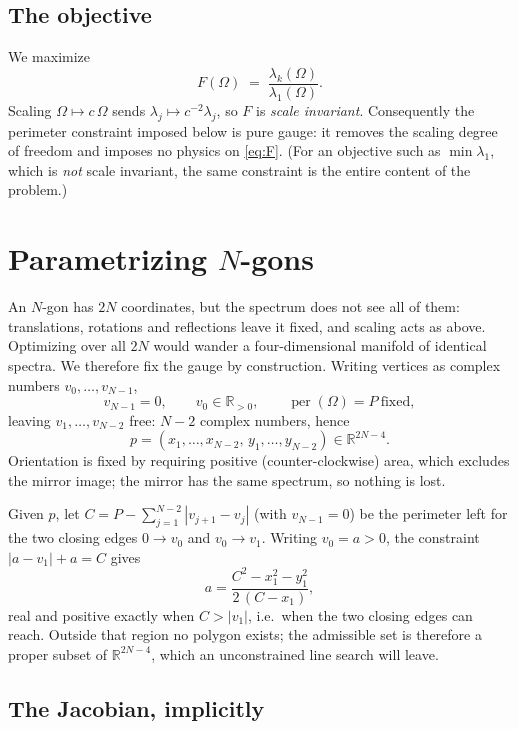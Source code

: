 \documentclass[11pt]{article}
\newcommand{\Om}{\Omega}
\theoremstyle{definition}
\begin{document}
\subsection{The objective}

We maximize
\begin{equation}\label{eq:F}
  F(\Om)\;=\;\frac{\lambda_k(\Om)}{\lambda_1(\Om)} .
\end{equation}
Scaling $\Om\mapsto c\,\Om$ sends $\lambda_j\mapsto c^{-2}\lambda_j$, so $F$ is
\emph{scale invariant}. Consequently the perimeter constraint imposed below is pure gauge: it
removes the scaling degree of freedom and imposes no physics on \eqref{eq:F}. (For an objective
such as $\min\lambda_1$, which is \emph{not} scale invariant, the same constraint is the entire
content of the problem.)

\section{Parametrizing $N$-gons}\label{sec:param}

An $N$-gon has $2N$ coordinates, but the spectrum does not see all of them: translations,
rotations and reflections leave it fixed, and scaling acts as above. Optimizing over all $2N$
would wander a four-dimensional manifold of identical spectra. We therefore fix the gauge by
construction. Writing vertices as complex numbers $v_0,\dots,v_{N-1}$,
\[
  v_{N-1}=0,\qquad v_0\in\mathbb{R}_{>0},\qquad \operatorname{per}(\Om)=P \ \text{fixed},
\]
leaving $v_1,\dots,v_{N-2}$ free: $N-2$ complex numbers, hence
\[
  p=(x_1,\dots,x_{N-2},\,y_1,\dots,y_{N-2})\in\mathbb{R}^{2N-4}.
\]
Orientation is fixed by requiring positive (counter-clockwise) area, which excludes the mirror
image; the mirror has the same spectrum, so nothing is lost.

Given $p$, let $C=P-\sum_{j=1}^{N-2}|v_{j+1}-v_j|$ (with $v_{N-1}=0$) be the perimeter left for
the two closing edges $0\to v_0$ and $v_0\to v_1$. Writing $v_0=a>0$, the constraint
$|a-v_1|+a=C$ gives
\begin{equation}\label{eq:a}
  a=\frac{C^2-x_1^2-y_1^2}{2\,(C-x_1)},
\end{equation}
real and positive exactly when $C>|v_1|$, i.e.\ when the two closing edges can reach. Outside
that region no polygon exists; the admissible set is therefore a proper subset of
$\mathbb{R}^{2N-4}$, which an unconstrained line search will leave.

\subsection{The Jacobian, implicitly}
\end{document}
